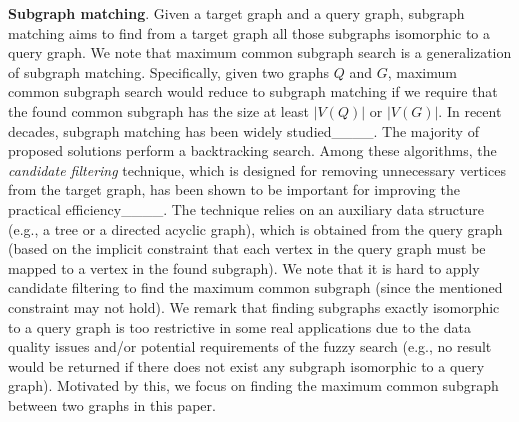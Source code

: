 \smallskip
\noindent\textbf{Subgraph matching}. Given a target graph and a query graph, subgraph matching aims to find from a target graph all those subgraphs isomorphic to a query graph. We note that maximum common subgraph search is a generalization of subgraph matching. Specifically, given two graphs $Q$ and $G$, maximum common subgraph search {\chengC would} reduce to subgraph matching if 
{\chengB we require}
that the found common subgraph has the size at least $|V(Q)|$ or $|V(G)|$. In recent decades, subgraph matching has been widely studied____. The majority of proposed solutions perform a backtracking search. Among these algorithms, the \emph{candidate filtering} technique, which is designed for removing unnecessary vertices from the target graph, has been shown to be important for improving the practical efficiency____. The technique relies on an auxiliary data structure (e.g., a tree or a directed acyclic graph), which is obtained from the query graph (based on the implicit constraint that each vertex in the query graph must be mapped to a vertex in the found subgraph). We note that it is hard to apply candidate filtering {\cheng to find} the maximum common subgraph (since the mentioned constraint may not hold).
%
We remark that finding subgraphs exactly isomorphic to a query graph is too restrictive in some real applications due to the data quality issues and/or potential requirements of the fuzzy search (e.g., no result {\chengC would} be returned if there does not exist any subgraph isomorphic to a query graph). Motivated by this, we focus on finding the maximum common subgraph between two graphs in this paper.